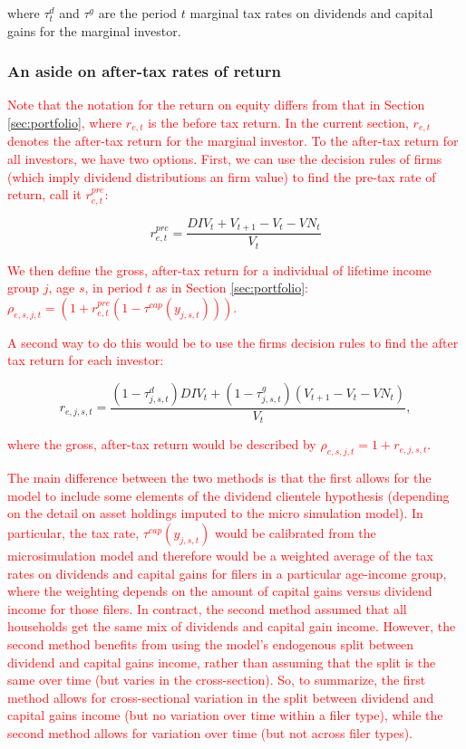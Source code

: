 \noindent\noindent where $\tau^{d}_{t}$ and $\tau^{g}$ are the period $t$ marginal tax rates on dividends and capital gains for the marginal investor.

\subsubsection{An aside on after-tax rates of return}

\textcolor{red}{Note that the notation for the return on equity differs from that in Section \ref{sec:portfolio}, where $r_{e,t}$ is the before tax return.  In the current section, $r_{e,t}$ denotes the after-tax return for the marginal investor.  To the after-tax return for all investors, we have two options.  First, we can use the decision rules of firms (which imply dividend distributions an firm value) to find the pre-tax rate of return, call it $r^{pre}_{e,t}$:}

\begin{equation}
r^{pre}_{e,t}=\frac{DIV_{t}+V_{t+1}-V_{t}-VN_{t}}{V_{t}}
\end{equation}

\noindent\noindent \textcolor{red}{We then define the gross, after-tax return for a individual of lifetime income group $j$, age $s$, in period $t$ as in Section \ref{sec:portfolio}: $\rho_{e,s,j,t}=(1+r^{pre}_{e,t}(1-\tau^{cap}(y_{j,s,t})))$.}

\textcolor{red}{A second way to do this would be to use the firms decision rules to find the after tax return for each investor:}

\begin{equation}
r_{e,j,s,t} = \frac{(1-\tau^{d}_{j,s,t})DIV_{t}+(1-\tau^{g}_{j,s,t})(V_{t+1}-V_{t}-VN_{t})}{V_{t}},
\end{equation} 

\noindent\noindent \textcolor{red}{where the gross, after-tax return would be described by $\rho_{e,s,j,t}=1+r_{e,j,s,t}$.}

\textcolor{red}{The main difference between the two methods is that the first allows for the model to include some elements of the dividend clientele hypothesis (depending on the detail on asset holdings imputed to the micro simulation model).  In particular, the tax rate, $\tau^{cap}(y_{j,s,t})$ would be calibrated from the microsimulation model and therefore would be a weighted average of the tax rates on dividends and capital gains for filers in a particular age-income group, where the weighting depends on the amount of capital gains versus dividend income for those filers.  In contract, the second method assumed that all households get the same mix of dividends and capital gain income.  However, the second method benefits from using the model's endogenous split between dividend and capital gains income, rather than assuming that the split is the same over time (but varies in the cross-section).  So, to summarize, the first method allows for cross-sectional variation in the split between dividend and capital gains income (but no variation over time within a filer type), while the second method allows for variation over time (but not across filer types).}

